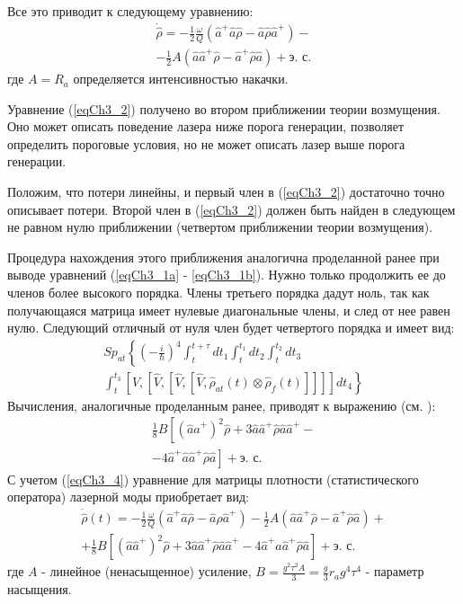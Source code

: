 Все это приводит к следующему уравнению:
\begin{eqnarray}
\dot{\hat{\rho}} =
- \frac{1}{2}\frac{\omega}{Q}
\left(\hat{a}^{+}\hat{a}\hat{\rho} - 
\hat{a}\hat{\rho}\hat{a}^{+}
\right)
-
\nonumber \\
- \frac{1}{2}A
\left(\hat{a}\hat{a}^{+}\hat{\rho} - 
\hat{a}^{+}\hat{\rho}\hat{a}
\right)
 + \mbox{э. с.}
\label{eqCh3_2}
\end{eqnarray}
где $A = R_a$ определяется интенсивностью накачки.

Уравнение (\ref{eqCh3_2}) получено во втором приближении теории
возмущения. Оно может описать поведение лазера ниже
порога генерации, позволяет определить пороговые условия, но не может
описать лазер выше порога генерации.  

Положим, что потери линейны, и первый член в (\ref{eqCh3_2})
достаточно точно описывает потери. Второй член в (\ref{eqCh3_2}) должен быть
найден в следующем не равном нулю приближении (четвертом приближении
теории возмущения).
 
Процедура нахождения этого приближения аналогична проделанной ранее
при выводе уравнений (\ref{eqCh3_1a} - \ref{eqCh3_1b}). Нужно только
продолжить ее до членов более высокого порядка. Члены третьего порядка
дадут ноль, так как получающаяся матрица имеет нулевые диагональные
члены, и след от нее равен нулю. Следующий отличный от нуля член будет 
четвертого порядка и имеет вид: 
\begin{eqnarray}
Sp_{at}\left\{
\left(-\frac{i}{\hbar}\right)^4
\int_t^{t+\tau}dt_1
\int_t^{t_1}dt_2
\int_t^{t_2}dt_3
\right.
\nonumber \\
\left.
\int_t^{t_3}
\left[\hat{V},
\left[\hat{V},
\left[\hat{V},
\left[\hat{V},
\hat{\rho}_{at}\left(t\right)
\otimes
\hat{\rho}_{f}\left(t\right)
\right]
\right]
\right]
\right]
dt_4
\right\}
\label{eqCh3_3}
\end{eqnarray}
Вычисления, аналогичные проделанным ранее, приводят к выражению
(см. \cite{bMandel2000}):
\begin{eqnarray}
\frac{1}{8}B\left[
\left(\hat{a} \hat{a}^{+}\right)^2\hat{\rho}
+ 3 \hat{a} \hat{a}^{+} \hat{\rho} \hat{a} \hat{a}^{+} -
\right.
\nonumber \\
\left.
-
4 \hat{a}^{+} \hat{a} \hat{a}^{+} \hat{\rho} \hat{a}
\right] + \mbox{э. с.}
\label{eqCh3_4}
\end{eqnarray}
С учетом (\ref{eqCh3_4}) уравнение для матрицы плотности
(статистического оператора) лазерной моды приобретает вид: 
\begin{eqnarray}
\dot{\hat{\rho}}\left(t\right) = 
- \frac{1}{2}\frac{\omega}{Q}
\left(\hat{a}^{+}\hat{a}\hat{\rho} - 
\hat{a}\hat{\rho}\hat{a}^{+}
\right)
- \frac{1}{2}A
\left(\hat{a}\hat{a}^{+}\hat{\rho} - 
\hat{a}^{+}\hat{\rho}\hat{a}
\right) + 
\nonumber \\
+ \frac{1}{8}B\left[
\left(\hat{a} \hat{a}^{+}\right)^2\hat{\rho}
+ 3 \hat{a} \hat{a}^{+} \hat{\rho} \hat{a} \hat{a}^{+} -
4 \hat{a}^{+} \hat{a} \hat{a}^{+} \hat{\rho} \hat{a}
\right] + \mbox{э. с.}
\label{eqCh3_5}
\end{eqnarray}
где $A$ - линейное (ненасыщенное) усиление, 
$B=\frac{g^2 \tau^2 A}{3} = \frac{g}{3}r_ag^4\tau^4$ - параметр
насыщения.

